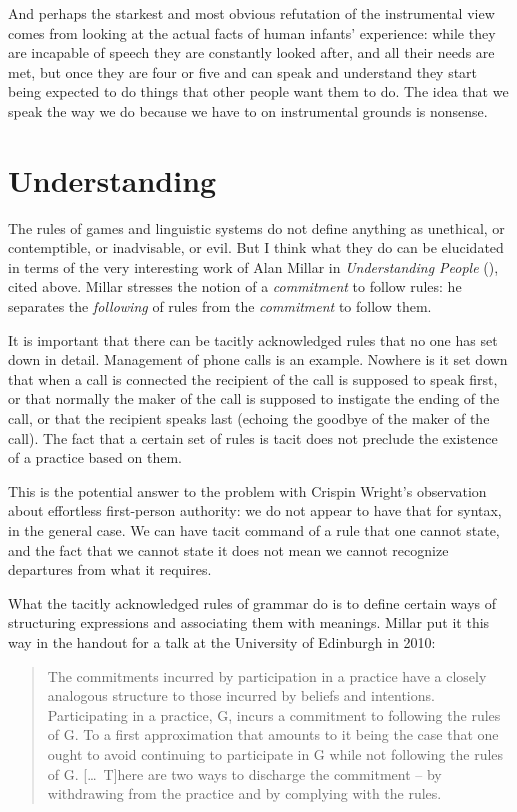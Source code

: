 \documentclass[output=paper]{langscibook}
\begin{document}
And perhaps the starkest and most obvious refutation of the instrumental view comes from looking at the actual facts of human infants' experience: while they are incapable of speech they are constantly looked after, and all their needs are met, but once they are four or five and can speak and understand they start being expected to do things that other people want them to do. The idea that we speak the way we do because we have to on instrumental grounds is nonsense.

\section{Understanding}
\label{sec:pullum:understanding}

The  rules of games and linguistic systems do not define anything as unethical, or contemptible, or inadvisable, or evil.  But I think what they do can be elucidated in terms of the very interesting work of Alan Millar in \textit{Understanding People} (\citeyear{Millar04}), cited above. Millar stresses the notion of a \emph{commitment} to follow rules: he separates the \emph{following} of rules from the \emph{commitment} to follow them.

It is important that there can be tacitly acknowledged rules that no one has set down in detail. Management of phone calls is an example. Nowhere is it set down that when a call is connected the recipient of the call is supposed to speak first, or that normally the maker of the call is supposed to instigate the ending of the call, or that the recipient speaks last (echoing the goodbye of the maker of the call). The fact that a certain set of rules is tacit does not preclude the existence of a practice based on them.

This is the potential answer to the problem with Crispin Wright's observation about effortless first-person authority: we do not appear to have that for syntax, in the general case.  We can have tacit command of a rule that one cannot state, and the fact that we cannot state it does not mean we cannot recognize departures from what it requires.

What the tacitly acknowledged rules of grammar do is to define certain ways of structuring expressions and associating them with meanings. Millar put it this way in the handout for a talk at the University of Edinburgh in 2010:

\begin{quote}
The commitments incurred by participation in a practice have a closely analogous structure to those incurred by beliefs and intentions. Participating in a practice, G, incurs a commitment to following the rules of G.  To a first approximation that amounts to it being the case that one ought to avoid continuing to participate in G while not following the rules of G.  [\ldots\ T]here are two ways to discharge the commitment -- by withdrawing from the practice and by complying with the rules. \end{quote} 
\end{document}
